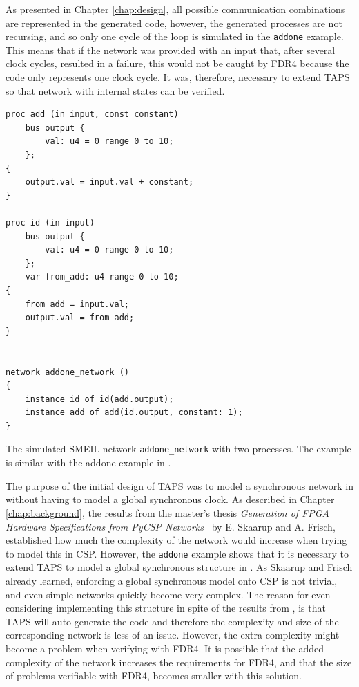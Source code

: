 As presented in Chapter \ref{chap:design}, all possible communication combinations are represented in the generated \cspm{} code, however, the generated \cspm{} processes are not recursing, and so only one cycle of the loop is simulated in the \texttt{addone} example. This means that if the network was provided with an input that, after several clock cycles, resulted in a failure, this would not be caught by FDR4 because the \cspm{} code only represents one clock cycle. It was, therefore, necessary to extend TAPS so that network with internal states can be verified.\\
\begin{listing}
\begin{verbatim}
proc add (in input, const constant)
    bus output {
        val: u4 = 0 range 0 to 10;
    };
{
    output.val = input.val + constant;
}

proc id (in input)
    bus output {
        val: u4 = 0 range 0 to 10;
    };
    var from_add: u4 range 0 to 10;
{
    from_add = input.val;
    output.val = from_add;
}


network addone_network ()
{
    instance id of id(add.output);
    instance add of add(id.output, constant: 1);
}
\end{verbatim}
\caption{The simulated SMEIL network \texttt{addone\_network} with two processes. The example is similar with the addone example in \cite{smeil}.}
\label{lst:addone_smeil_example}
\end{listing}

The purpose of the initial design of TAPS was to model a synchronous network in \cspm{} without having to model a global synchronous clock. As described in Chapter \ref{chap:background}, the results from the master's thesis \textit{Generation of FPGA Hardware
Specifications from PyCSP Networks}~\cite{Skaarup14} by E. Skaarup and A. Frisch, established how much the complexity of the network would increase when trying to model this in CSP.
However, the \texttt{addone} example shows that it is necessary to extend TAPS to model a global synchronous structure in \cspm{}. As Skaarup and Frisch already learned, enforcing a global synchronous model onto CSP is not trivial, and even simple networks quickly become very complex. The reason for even considering implementing this structure in spite of the results from \cite{Skaarup14}, is that TAPS will auto-generate the \cspm{} code and therefore the complexity and size of the corresponding \cspm{} network is less of an issue. However, the extra complexity might become a problem when verifying with FDR4. It is possible that the added complexity of the network increases the requirements for FDR4, and that the size of problems verifiable with FDR4, becomes smaller with this solution. \\

